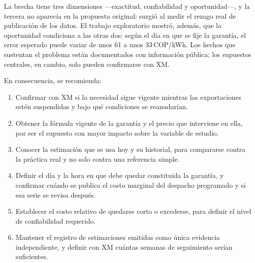 \documentclass[11pt,letterpaper]{article}
\newcommand{\cop}{\,COP/kWh}
\begin{document}
La brecha tiene tres dimensiones ---exactitud, confiabilidad y
oportunidad---, y la tercera no aparecía en la propuesta original: surgió
al medir el rezago real de publicación de los datos. El trabajo
exploratorio mostró, además, que la oportunidad condiciona a las otras
dos: según el día en que se fije la garantía, el error esperado puede
variar de unos 61 a unos 33\cop. Los hechos que
sustentan el problema están documentados con información pública; los
supuestos centrales, en cambio, solo pueden confirmarse con XM.

En consecuencia, se recomienda:

\begin{enumerate}
  \item Confirmar con XM si la necesidad sigue vigente mientras las
        exportaciones estén suspendidas y bajo qué condiciones se
        reanudarían.
  \item Obtener la fórmula vigente de la garantía y el precio que
        interviene en ella, por ser el supuesto con mayor impacto sobre
        la variable de estudio.
  \item Conocer la estimación que se usa hoy y su historial, para
        compararse contra la práctica real y no solo contra una
        referencia simple.
  \item Definir el día y la hora en que debe quedar constituida la
        garantía, y confirmar cuándo se publica el costo marginal del
        despacho programado y si esa serie se revisa después.
  \item Establecer el costo relativo de quedarse corto o excederse, para
        definir el nivel de confiabilidad requerido.
  \item Mantener el registro de estimaciones emitidas como única
        evidencia independiente, y definir con XM cuántas semanas de
        seguimiento serían suficientes.
\end{enumerate}
\end{document}
